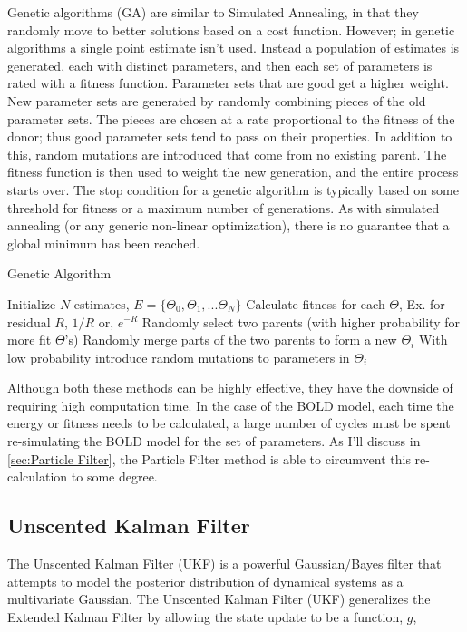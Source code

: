 Genetic algorithms (GA) are similar to Simulated Annealing, in
that they randomly move to better solutions based on a cost function.
However; in genetic algorithms a single point estimate isn't used. Instead
a population of estimates is generated, each with distinct parameters,
and then each set of parameters is rated with a fitness function. Parameter
sets that are good get a higher weight. New parameter sets are generated by 
randomly combining pieces of the old parameter sets. The pieces are 
chosen at a rate proportional to the fitness of the donor; thus good
parameter sets tend to pass on their properties. In addition to this,
random mutations are introduced that come from no existing parent. 
The fitness function is then used to weight the new generation, and
the entire process starts over. The stop condition for a genetic algorithm
is typically based on some threshold for fitness or a maximum number 
of generations. As with simulated annealing (or any generic non-linear optimization),
there is no guarantee that a global minimum has been reached.

\begin{algorithm}
\caption{Genetic Algorithm}
\label{alg:Genetic Algorithm}
\begin{algorithmic}
\STATE Initialize $N$ estimates, $E = \{\Theta_0, \Theta_1, ... \Theta_N\}$
    \STATE Calculate fitness for each $\Theta$, Ex. for residual $R$, $1/R$ or, $e^{-R}$
        \STATE Randomly select two parents (with higher probability for more fit $\Theta$'s)
        \STATE Randomly merge parts of the two parents to form a new $\Theta_i$
        \STATE With low probability introduce random mutations to parameters in $\Theta_i$
    \ENDFOR
\ENDFOR
\end{algorithmic}
\end{algorithm}

Although both these methods can be highly effective, they have the downside of
requiring high computation time. In the case of the BOLD model,
each time the energy or fitness needs to be calculated, a large number of cycles
must be spent re-simulating the BOLD model for the set of parameters. As I'll
discuss in \autoref{sec:Particle Filter}, the Particle Filter method is able
to circumvent this re-calculation to some degree.

\subsection{Unscented Kalman Filter}
\label{sec:Unscented Kalman Filter}
The Unscented Kalman Filter (UKF) is a powerful Gaussian/Bayes filter that attempts
to model the posterior distribution of dynamical systems as a multivariate
Gaussian. The Unscented Kalman Filter (UKF) generalizes the Extended Kalman
Filter by allowing the state update to be a function, $g$,

